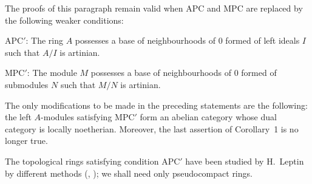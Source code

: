 \begin{remark}
The proofs of this paragraph remain valid when APC and MPC are replaced
by the following weaker conditions:

APC$'$: The ring $A$ possesses a base of neighbourhoods of $0$ formed
of left ideals $I$ such that $A/I$ is artinian.

MPC$'$: The module $M$ possesses a base of neighbourhoods of $0$
formed of submodules $N$ such that $M/N$ is artinian.

The only modifications to be made in the preceding statements are the
following: the left $A$-modules satisfying MPC$'$ form an abelian
category whose dual category is locally noetherian. Moreover, the last
assertion of Corollary~1 is no longer true.

The topological rings satisfying condition APC$'$ have been studied by
H.~Leptin by different methods (\cite{leptin-1}, \cite{leptin-2}); we
shall need only pseudocompact rings.
\end{remark}
